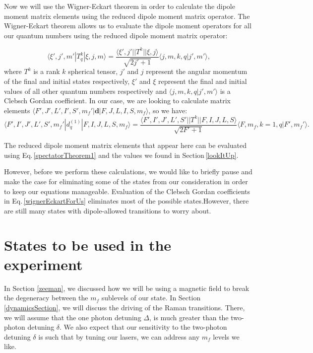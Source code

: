 Now we will use the Wigner-Eckart theorem in order to calculate the dipole moment matrix elements using the reduced dipole moment matrix operator. The Wigner-Eckart theorem allows us to evaluate the dipole moment operators for all our quantum numbers using the reduced dipole moment matrix operator:

\begin{equation}\label{wignerEckart}
\langle \xi',j',m'|T^k_q|\xi,j,m\rangle = \frac{\langle \xi',j'||T^k||\xi,j\rangle}{\sqrt{2j'+1}}\langle j,m,k,q|j',m'\rangle,
\end{equation}
where $T^k$ is a rank $k$ spherical tensor, $j'$ and $j$ represent the angular momentum of the final and initial states respectively, $\xi'$ and $\xi$ represent the final and initial values of all other quantum numbers respectively and $\langle j,m,k,q|j',m'\rangle$ is a Clebsch Gordan coefficient. In our case, we are looking to calculate matrix elements  $\langle F',J',L',I',S',m_f'|\mathbf{d}|F,J,L,I,S,m_f\rangle$, so we have:
\begin{equation}\label{wignerEckartForUs}
\langle F',I',J',L',S',m_f'|d^{(1)}_q|F,I,J,L,S,m_f\rangle = \frac{\langle F',I',J',L',S'||T^k||F,I,J,L,S\rangle}{\sqrt{2F'+1}}\langle F,m_f,k=1,q|F',m_f'\rangle.
\end{equation}

The reduced dipole moment matrix elements that appear here can be evaluated using Eq.\,\ref{spectatorTheorem1} and the values we found in Section\,\ref{lookItUp}. 

However, before we perform these calculations, we would like to briefly pause and make the case for eliminating some of the states from our consideration in order to keep our equations manageable. 
Evaluation of the Clebsch Gordan coefficients in Eq.\,\ref{wignerEckartForUs} eliminates most of the possible states.However, there are still many states with dipole-allowed transitions to worry about. 

\section{States to be used in the experiment}
\label{figureOutStatesSection}

In Section \ref{zeeman}, we discussed how we will be using a magnetic field to break the degeneracy between the $m_f$ sublevels of our state.
In Section \ref{dynamicsSection}, we will discuss the driving of the Raman transitions. There, we will assume that the one photon detuning $\Delta$, is much greater than the two-photon detuning $\delta$. We also expect that our sensitivity to the two-photon detuning $\delta$ is such that by tuning our lasers, we can address any $m_f$ levels we like.

